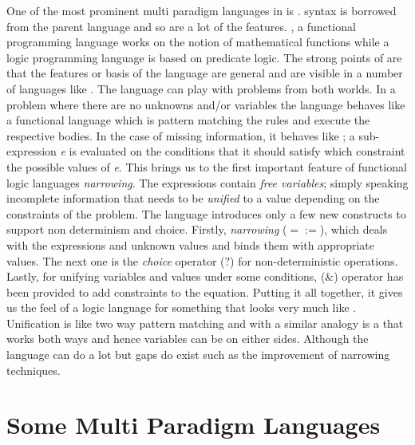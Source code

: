 \documentclass[thesis-solanki.tex]{subfiles}
\begin{document}
One of the most prominent multi paradigm languages in  is 
\cite{antoy2010functional}.
 syntax is borrowed from the parent language and so are a lot of the features.
, a functional programming language works on the notion of mathematical functions while a logic
programming language is based on predicate logic.
The strong points of  are that the features or basis of the language are general and are visible in
a number of languages like \cite{website:toy}.
The language can play with problems from both worlds.
In a problem where there are no unknowns and/or variables the language behaves like a functional language which is
pattern matching the rules and execute the respective bodies.
In the case of missing information, it behaves like ; a sub-expression \textit{e} is evaluated on
the conditions that it should satisfy which constraint the possible values of \textit{e}.
This brings us to the first important feature of functional logic languages \textit{narrowing}.
The expressions contain \textit{free variables}; simply speaking incomplete information that needs to be
\textit{unified} to a value depending on the constraints of the problem.
The language introduces only a few new constructs to support non determinism and choice.
Firstly, \textit{narrowing} ($\mathtt{=:=}$), which deals with the expressions and unknown values and binds them
with appropriate values.
The next one is the \textit{choice} operator ($\mathtt{?}$) for non-deterministic operations.
Lastly, for unifying variables and values under some conditions, ($\mathtt{\&}$) operator has been provided to add
constraints to the equation.
Putting it all together, it gives us the feel of a logic language for something that looks very much like
.
Unification is like two way pattern matching and with a similar analogy  is a 
that works both ways and hence variables can be on either sides.
Although the language can do a lot but gaps do exist such as the improvement of narrowing techniques.
 
 

\section{Some Multi Paradigm Languages}
\end{document}
